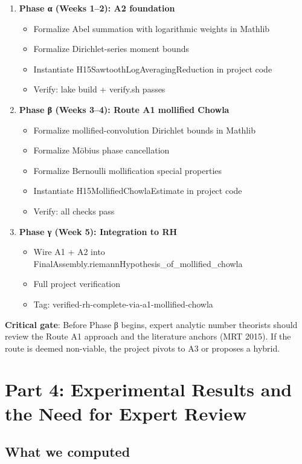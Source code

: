 \documentclass[11pt,a4paper]{article}
\begin{document}
\begin{enumerate}
\item \textbf{Phase α (Weeks 1--2): A2 foundation}
\begin{itemize}
\item Formalize Abel summation with logarithmic weights in Mathlib
\item Formalize Dirichlet-series moment bounds
\item Instantiate H15SawtoothLogAveragingReduction in project code
\item Verify: lake build + verify.sh passes
\end{itemize}

\item \textbf{Phase β (Weeks 3--4): Route A1 mollified Chowla}
\begin{itemize}
\item Formalize mollified-convolution Dirichlet bounds in Mathlib
\item Formalize Möbius phase cancellation
\item Formalize Bernoulli mollification special properties
\item Instantiate H15MollifiedChowlaEstimate in project code
\item Verify: all checks pass
\end{itemize}

\item \textbf{Phase γ (Week 5): Integration to RH}
\begin{itemize}
\item Wire A1 + A2 into FinalAssembly.riemannHypothesis\_of\_mollified\_chowla
\item Full project verification
\item Tag: verified-rh-complete-via-a1-mollified-chowla
\end{itemize}
\end{enumerate}

\textbf{Critical gate}: Before Phase β begins, expert analytic number theorists should review the Route A1 approach and the literature anchors (MRT 2015). If the route is deemed non-viable, the project pivots to A3 or proposes a hybrid.

\section{Part 4: Experimental Results and the Need for Expert Review}

\subsection{What we computed}
\end{document}
